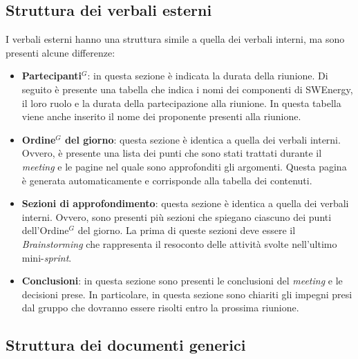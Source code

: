 \subsection{Struttura dei verbali esterni}
I verbali esterni hanno una struttura simile a quella dei verbali interni, ma
sono presenti alcune differenze:
\begin{itemize}
	\item \textbf{\gls{Partecipanti}$^G$}: in questa sezione è indicata la durata della
	      riunione. Di seguito è presente una tabella che indica i nomi dei
	      componenti di SWEnergy, il loro ruolo e la durata della partecipazione
	      alla riunione. In questa tabella viene anche inserito il nome dei
	      proponente presenti alla riunione.

	\item \textbf{\gls{Ordine}$^G$ del giorno}: questa sezione è identica a quella dei
	      verbali interni. Ovvero, è presente una lista dei punti che sono stati
	      trattati durante il \textit{meeting} e le pagine nel quale sono
	      approfonditi gli argomenti. Questa pagina è generata automaticamente
	      e corrisponde alla tabella dei contenuti.

	\item \textbf{Sezioni di approfondimento}: questa sezione è identica a
	      quella dei verbali interni. Ovvero, sono presenti più sezioni che
	      spiegano ciascuno dei punti dell'\gls{Ordine}$^G$ del giorno. La prima di queste
	      sezioni deve essere il \textit{Brainstorming} che rappresenta il
	      resoconto delle attività svolte nell'ultimo mini-\textit{sprint}.

	\item \textbf{Conclusioni}: in questa sezione sono presenti le conclusioni
	      del \textit{meeting} e le decisioni prese. In particolare, in questa
	      sezione sono chiariti gli impegni presi dal gruppo che dovranno essere
	      risolti entro la prossima riunione.
\end{itemize}

\subsection{Struttura dei documenti generici}


